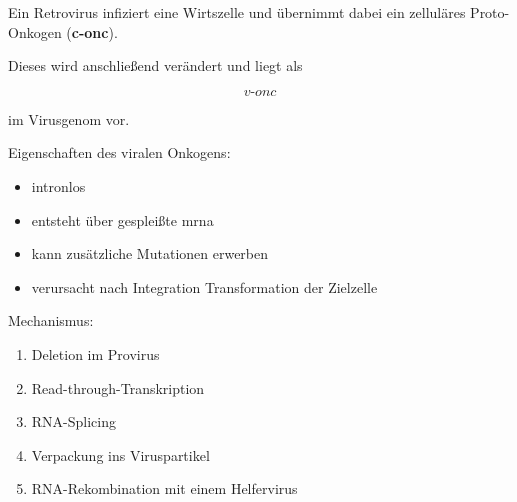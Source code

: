 Ein Retrovirus infiziert eine Wirtszelle
und übernimmt dabei ein zelluläres
Proto-Onkogen
(\textbf{c-onc}).

Dieses wird anschließend verändert
und liegt als

\[
    v\text{-}onc
\]

im Virusgenom vor.

Eigenschaften des viralen Onkogens:

\begin{itemize}

    \item intronlos

    \item entsteht über gespleißte \gls{mrna}

    \item kann zusätzliche Mutationen erwerben

    \item verursacht nach Integration
    Transformation der Zielzelle

\end{itemize}

Mechanismus:

\begin{enumerate}

    \item Deletion im Provirus

    \item Read-through-Transkription

    \item RNA-Splicing

    \item Verpackung ins Viruspartikel

    \item RNA-Rekombination
    mit einem Helfervirus

\end{enumerate}



